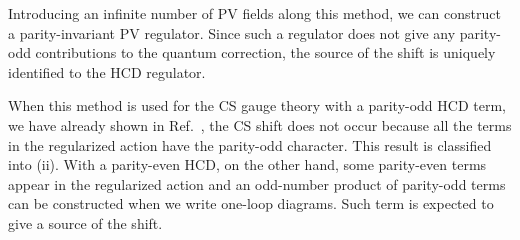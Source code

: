 \documentclass[a4paper,12pt]{article}
\begin{document}
Introducing an infinite number of PV fields along this method,
we can construct a parity-invariant PV regulator.
%
Since such a regulator does not give any parity-odd contributions
to the quantum correction,
the source of the shift is uniquely identified to the HCD regulator.


When this method is used for the CS gauge theory with a parity-odd HCD term,
we have already shown in Ref.~\cite{Nittoh:1998ey},
the CS shift does not occur
because all the terms in the regularized action
have the parity-odd character.
%
This result is classified into (ii).
%
With a parity-even HCD, on the other hand,
some parity-even terms appear in the regularized action
and an odd-number product of parity-odd terms
can be constructed when we write one-loop diagrams.
%
Such term is expected to give a source of the shift.









\label{sec:YMCS}
\end{document}
